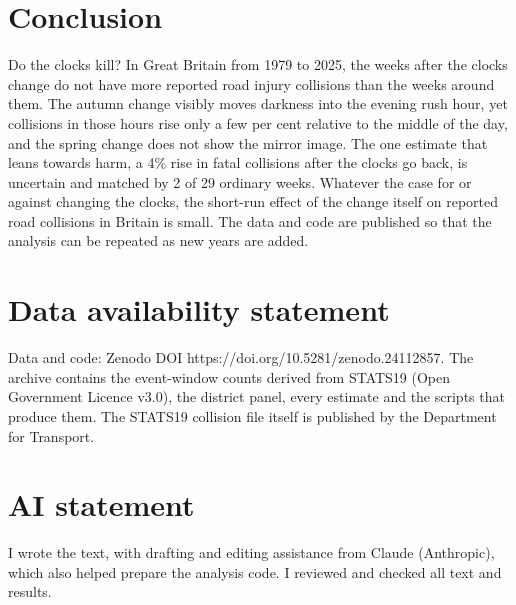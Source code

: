 \documentclass[11pt,a4paper]{article}
\begin{document}
\section{Conclusion}\label{sec:conc}
Do the clocks kill? In Great Britain from 1979 to 2025, the weeks after the clocks change do not have more reported road injury collisions than the weeks around them. The autumn change visibly moves darkness into the evening rush hour, yet collisions in those hours rise only a few per cent relative to the middle of the day, and the spring change does not show the mirror image. The one estimate that leans towards harm, a 4\% rise in fatal collisions after the clocks go back, is uncertain and matched by 2 of 29 ordinary weeks. Whatever the case for or against changing the clocks, the short-run effect of the change itself on reported road collisions in Britain is small. The data and code are published so that the analysis can be repeated as new years are added.

\section*{Data availability statement}
Data and code: Zenodo DOI https://doi.org/10.5281/zenodo.24112857. The archive contains the event-window counts derived from STATS19 (Open Government Licence v3.0), the district panel, every estimate and the scripts that produce them. The STATS19 collision file itself is published by the Department for Transport.

\section*{AI statement}
I wrote the text, with drafting and editing assistance from Claude (Anthropic), which also helped prepare the analysis code. I reviewed and checked all text and results.
\end{document}
